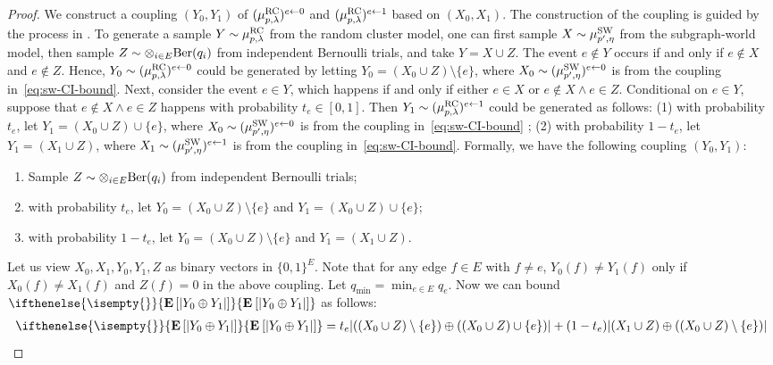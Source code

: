 \documentclass[11pt,a4paper]{article}
\theoremstyle{definition}
\newcommand{\E}[2][]{ \ifthenelse{\isempty{#1}}
  {\mathbf{\mathbf{E}}\left[#2\right]}
  {\mathbf{\mathbf{E}}_{#1}\left[#2\right]} }
\begin{document}
\begin{proof}
    We construct a coupling $(Y_0,Y_1)$ of $(\mu_{p,\lambda}^{\textnormal{RC}})^{e \gets 0}$ and $(\mu_{p,\lambda}^{\textnormal{RC}})^{e \gets 1}$ based on $(X_0,X_1)$.
    The construction of the coupling is guided by the process in . 
    To generate a sample $Y \sim \mu_{p,\lambda}^{\textnormal{RC}}$ from the random cluster model, one can first sample $X \sim \mu_{p',\eta}^{\textnormal{SW}}$ from the subgraph-world model, then sample $Z \sim \otimes_{i\in E}\textnormal{Ber}(q_i)$ from independent Bernoulli trials, and take $Y = X \cup Z$.
    The event $e \notin Y$ occurs if and only if $e \notin X$ and $e \notin Z$. 
    Hence, $Y_0 \sim (\mu_{p,\lambda}^{\textnormal{RC}})^{e \gets 0}$ could be generated by letting $Y_0 = (X_0\cup Z)\setminus\{e\}$, where $X_0 \sim (\mu_{p',\eta}^{\textnormal{SW}})^{e \gets 0}$ is from the coupling in~\eqref{eq:sw-CI-bound}. 
    Next, consider the event $e \in Y$, which happens if and only if either $e \in X$ or $e \notin X \land e \in Z$. 
    Conditional on $e \in Y$, suppose that $e \notin X \land e \in Z$ happens with probability $t_e \in [0,1]$.
    Then $Y_1 \sim (\mu_{p,\lambda}^{\textnormal{RC}})^{e \gets 1}$ could be generated as follows: (1) with probability $t_e$, let $Y_1 = (X_0\cup Z)\cup \{e\}$, where $X_0 \sim (\mu_{p',\eta}^{\textnormal{SW}})^{e\gets 0}$ is from the coupling in~\eqref{eq:sw-CI-bound} ; (2) with probability $1-t_e$, let $Y_1 = (X_1\cup Z)$, where $X_1 \sim (\mu_{p',\eta}^{\textnormal{SW}})^{e\gets 1}$ is from the coupling in~\eqref{eq:sw-CI-bound}.
    Formally, we have the following coupling $(Y_0,Y_1)$:
    \begin{enumerate}
       \item Sample $Z\sim \otimes_{i\in E}\textnormal{Ber}(q_i)$ from independent Bernoulli trials;
       \item with probability $t_e$, let $Y_0=(X_0\cup Z)\setminus \{e\}$ and $Y_1=(X_0\cup Z)\cup \{e\}$;
       \item with probability $1-t_e$, let $Y_0=(X_0\cup Z)\setminus \{e\}$ and $Y_1=(X_1\cup Z)$.  
    \end{enumerate}
    Let us view $X_0,X_1,Y_0,Y_1,Z$ as binary vectors in $\{0,1\}^E$.
    Note that for any edge $f \in E$ with $f \neq e$, $Y_0(f) \neq Y_1(f)$ only if $X_0(f) \neq X_1(f)$ and $Z(f) = 0$ in the above coupling.
    Let $q_{\min} = \min_{e\in E} q_e$.
    Now we can bound $\E[]{|Y_0\oplus Y_1|}$ as follows:
    \begin{align*}
        \E[]{|Y_0\oplus Y_1|}&=t_e|((X_0\cup Z)\setminus \{e\})\oplus ((X_0\cup Z)\cup \{e\})|+(1-t_e)|(X_1\cup Z) \oplus ((X_0\cup Z) \setminus \{e\})| \\

\end{align*}
\end{proof}
\end{document}
